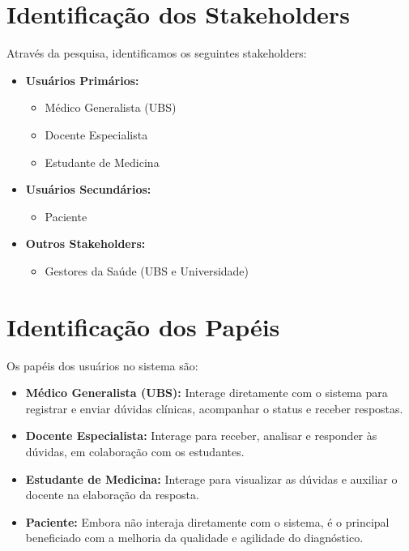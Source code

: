 \documentclass[12pt, a4paper, oneside]{abntex2}
\begin{document}
\section{Identificação dos Stakeholders}
\label{sec:stakeholders}
Através da pesquisa, identificamos os seguintes stakeholders:
\begin{itemize}
    \item \textbf{Usuários Primários:}
    \begin{itemize}
        \item Médico Generalista (UBS)
        \item Docente Especialista
        \item Estudante de Medicina
    \end{itemize}
    \item \textbf{Usuários Secundários:}
    \begin{itemize}
        \item Paciente
    \end{itemize}
    \item \textbf{Outros Stakeholders:}
    \begin{itemize}
        \item Gestores da Saúde (UBS e Universidade)
    \end{itemize}
\end{itemize}

\section{Identificação dos Papéis}
\label{sec:papeis}
Os papéis dos usuários no sistema são:
\begin{itemize}
    \item \textbf{Médico Generalista (UBS):} Interage diretamente com o sistema para registrar e enviar dúvidas clínicas, acompanhar o status e receber respostas.
    \item \textbf{Docente Especialista:} Interage para receber, analisar e responder às dúvidas, em colaboração com os estudantes.
    \item \textbf{Estudante de Medicina:} Interage para visualizar as dúvidas e auxiliar o docente na elaboração da resposta.
    \item \textbf{Paciente:} Embora não interaja diretamente com o sistema, é o principal beneficiado com a melhoria da qualidade e agilidade do diagnóstico.
\end{itemize}
\end{document}
